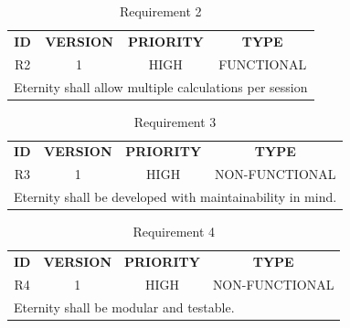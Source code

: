 \documentclass[11pt,a4paper]{report}
\theoremstyle{definition}
\theoremstyle{remark}
\begin{document}
        \begin{table}[ht]
        \centering
            \begin{tabular}{cccc} %
                \textbf{ID} & \textbf{VERSION} & \textbf{PRIORITY} & \textbf{TYPE}\\
                        R2  &           1      &           HIGH    &      FUNCTIONAL\\
                \hline
                \multicolumn{4}{l}{Eternity shall allow multiple calculations per session}
            \end{tabular}
            \caption{Requirement 2}
            \label{tab:table-requirements-2}
        \end{table}
        \vspace{3em}
        
        \begin{table}[ht]
        \centering
            \begin{tabular}{cccc} %
                \textbf{ID} & \textbf{VERSION} & \textbf{PRIORITY} & \textbf{TYPE}\\
                        R3  &           1      &           HIGH    &      NON-FUNCTIONAL\\
                \hline
                \multicolumn{4}{l}{Eternity shall be developed with maintainability in mind.}
            \end{tabular}
            \caption{Requirement 3}
            \label{tab:table-requirements-3}
        \end{table}
        \vspace{3em}

        \begin{table}[ht]
        \centering
            \begin{tabular}{cccc} %
                \textbf{ID} & \textbf{VERSION} & \textbf{PRIORITY} & \textbf{TYPE}\\
                        R4  &           1      &           HIGH    &      NON-FUNCTIONAL\\
                \hline
                \multicolumn{4}{l}{Eternity shall be modular and testable.}
            \end{tabular}
            \caption{Requirement 4}
            \label{tab:table-requirements-4}
        \end{table}
        \vspace{3em}
        
\end{document}

